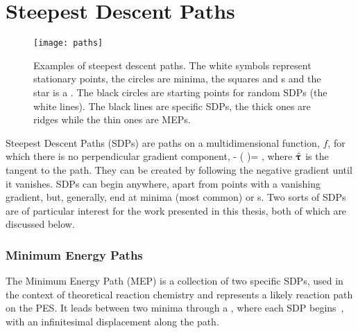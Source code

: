 \section{Steepest Descent Paths}
\label{sec:sdps}

\begin{figure}[h]
  \begin{center}
    \texttt{[image: paths]}
    \parbox{0.85\linewidth}{
      \caption{Examples of steepest descent paths.
The white symbols represent stationary points, the circles are minima, the squares and s and the star is a .
The black circles are starting points for random SDPs (the white lines).
The black lines are specific SDPs, the thick ones are ridges while the thin ones are MEPs.
      }
      \label{fig:paths}
    }
  \end{center}
\end{figure}

Steepest Descent Paths (SDPs) are paths on a multidimensional function, $f$, for which there is no perpendicular gradient component,
\nabla {} - (\nabla {} \cdot \uvt)\uvt = ,
\eeq
where $\hat{{\mathrm{\mathbf{\bm{\uptau}}}}}$ is the tangent to the path.
They can be created by following the negative gradient until it vanishes.
SDPs can begin anywhere, apart from points with a vanishing gradient, but, generally, end at minima (most common) or \sap{}s.
Two sorts of SDPs are of particular interest for the work presented in this thesis, both of which are discussed below.


\subsubsection{Minimum Energy Paths}


The Minimum Energy Path (MEP) is a collection of two specific SDPs, used in the context of theoretical reaction chemistry and represents a likely reaction path on the PES.
It leads between two minima through a , where each SDP begins~\cite{neb-polemic-henkelman1}, with an infinitesimal displacement along the path.

